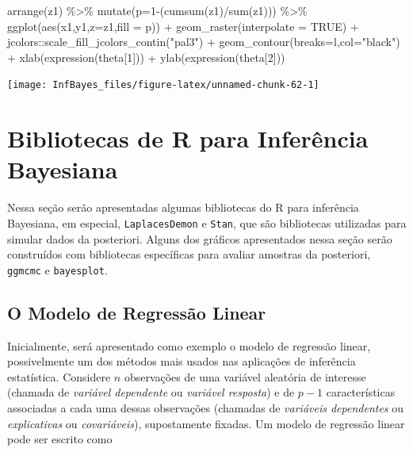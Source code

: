 \documentclass[
]{book}
\newenvironment{Shaded}{\begin{snugshade}}{\end{snugshade}}
\newcommand{\AttributeTok}[1]{\textcolor[rgb]{0.77,0.63,0.00}{#1}}
\newcommand{\ConstantTok}[1]{\textcolor[rgb]{0.00,0.00,0.00}{#1}}
\newcommand{\DecValTok}[1]{\textcolor[rgb]{0.00,0.00,0.81}{#1}}
\newcommand{\FunctionTok}[1]{\textcolor[rgb]{0.00,0.00,0.00}{#1}}
\newcommand{\NormalTok}[1]{#1}
\newcommand{\SpecialCharTok}[1]{\textcolor[rgb]{0.00,0.00,0.00}{#1}}
\newcommand{\StringTok}[1]{\textcolor[rgb]{0.31,0.60,0.02}{#1}}
\begin{document}
\begin{Shaded}
\begin{Highlighting}[]
  \FunctionTok{arrange}\NormalTok{(z1) }\SpecialCharTok{\%\textgreater{}\%} \FunctionTok{mutate}\NormalTok{(}\AttributeTok{p=}\DecValTok{1}\SpecialCharTok{{-}}\NormalTok{(}\FunctionTok{cumsum}\NormalTok{(z1)}\SpecialCharTok{/}\FunctionTok{sum}\NormalTok{(z1))) }\SpecialCharTok{\%\textgreater{}\%}
  \FunctionTok{ggplot}\NormalTok{(}\FunctionTok{aes}\NormalTok{(x1,y1,}\AttributeTok{z=}\NormalTok{z1,}\AttributeTok{fill =}\NormalTok{ p)) }\SpecialCharTok{+}
  \FunctionTok{geom\_raster}\NormalTok{(}\AttributeTok{interpolate =} \ConstantTok{TRUE}\NormalTok{) }\SpecialCharTok{+}
\NormalTok{  jcolors}\SpecialCharTok{::}\FunctionTok{scale\_fill\_jcolors\_contin}\NormalTok{(}\StringTok{"pal3"}\NormalTok{) }\SpecialCharTok{+}
  \FunctionTok{geom\_contour}\NormalTok{(}\AttributeTok{breaks=}\NormalTok{l,}\AttributeTok{col=}\StringTok{"black"}\NormalTok{) }\SpecialCharTok{+}
  \FunctionTok{xlab}\NormalTok{(}\FunctionTok{expression}\NormalTok{(theta[}\DecValTok{1}\NormalTok{])) }\SpecialCharTok{+} \FunctionTok{ylab}\NormalTok{(}\FunctionTok{expression}\NormalTok{(theta[}\DecValTok{2}\NormalTok{]))}
\end{Highlighting}
\end{Shaded}

\begin{center}\texttt{[image: InfBayes\_files/figure-latex/unnamed-chunk-62-1]} \end{center}

\hypertarget{bibliotecas-de-r-para-inferuxeancia-bayesiana}{%
\section{Bibliotecas de R para Inferência Bayesiana}\label{bibliotecas-de-r-para-inferuxeancia-bayesiana}}

Nessa seção serão apresentadas algumas bibliotecas do R para inferência Bayesiana, em especial, \texttt{LaplacesDemon} e \texttt{Stan}, que são bibliotecas utilizadas para simular dados da posteriori. Alguns dos gráficos apresentados nessa seção serão construídos com bibliotecas específicas para avaliar amostras da posteriori, \texttt{ggmcmc} e \texttt{bayesplot}.

\hypertarget{o-modelo-de-regressuxe3o-linear}{%
\subsection{O Modelo de Regressão Linear}\label{o-modelo-de-regressuxe3o-linear}}

Inicialmente, será apresentado como exemplo o modelo de regressão linear, possivelmente um dos métodos mais usados nas aplicações de inferência estatística. Considere \(n\) observações de uma variável aleatória de interesse (chamada de \emph{variável dependente} ou \emph{variável resposta}) e de \(p-1\) características associadas a cada uma dessas observações (chamadas de \emph{variáveis dependentes} ou \emph{explicativas} ou \emph{covariáveis}), supostamente fixadas. Um modelo de regressão linear pode ser escrito como
\end{document}
